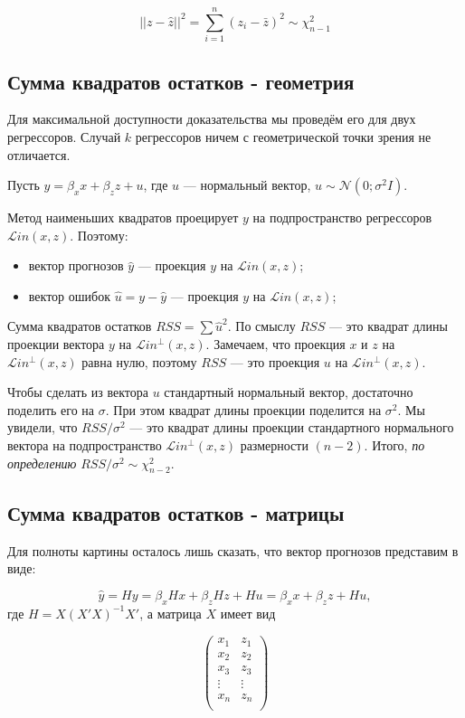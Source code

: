 \documentclass[11pt,russian,]{article}
\providecommand{\tightlist}{%
  \setlength{\itemsep}{0pt}\setlength{\parskip}{0pt}}
\newcommand{\cN}{\mathcal{N}}
\newcommand{\1}{\mathbbm{1}}
\newcommand{\Lin}{\mathcal{L}in}
\newcommand{\Linp}{\Lin^{\perp}}
\begin{document}
\[
||z - \hat z||^2 = \sum_{i=1}^n (z_i - \bar z)^2 \sim \chi^2_{n-1}
\]

\subsection{Сумма квадратов остатков - геометрия}\label{-----}

Для максимальной доступности доказательства мы проведём его для двух
регрессоров. Случай \(k\) регрессоров ничем с геометрической точки
зрения не отличается.

Пусть \(y = \beta_x x + \beta_z z + u\), где \(u\) --- нормальный
вектор, \(u \sim \cN (0; \sigma^2 I)\).

Метод наименьших квадратов проецирует \(y\) на подпространство
регрессоров \(\Lin(x, z)\). Поэтому:

\begin{itemize}
\tightlist
\item
  вектор прогнозов \(\hat y\) --- проекция \(y\) на \(\Lin(x, z)\);
\item
  вектор ошибок \(\hat u = y - \hat y\) --- проекция \(y\) на
  \(\Lin(x, z)\);
\end{itemize}

Сумма квадратов остатков \(RSS = \sum \hat u^2\). По смыслу \(RSS\) ---
это квадрат длины проекции вектора \(y\) на \(\Linp(x, z)\). Замечаем,
что проекция \(x\) и \(z\) на \(\Linp(x, z)\) равна нулю, поэтому
\(RSS\) --- это проекция \(u\) на \(\Linp(x, z)\).

Чтобы сделать из вектора \(u\) стандартный нормальный вектор, достаточно
поделить его на \(\sigma\). При этом квадрат длины проекции поделится на
\(\sigma^2\). Мы увидели, что \(RSS/\sigma^2\) --- это квадрат длины
проекции стандартного нормального вектора на подпространство
\(\Linp(x, z)\) размерности \((n-2)\). Итого, \emph{по определению}
\(RSS/\sigma^2 \sim \chi^2_{n-2}\).

\subsection{Сумма квадратов остатков - матрицы}\label{-----}

Для полноты картины осталось лишь сказать, что вектор прогнозов
представим в виде:

\[
\hat y = H y = \beta_x Hx + \beta_z Hz + H u = \beta_x x + \beta_z z + H u,
\] где \(H = X(X'X)^{-1}X'\), а матрица \(X\) имеет вид

\[
\begin{pmatrix}
x_1 & z_1 \\
x_2 & z_2 \\
x_3 & z_3 \\
\vdots & \vdots \\
x_n & z_n \\
\end{pmatrix}
\]
\end{document}
